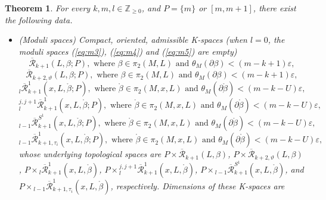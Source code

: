 \documentclass[a4paper]{article}
\newtheorem{theorem}{Theorem}
\numberwithin{equation}{section}
\begin{document}
\begin{theorem}\label{theorem:moduli}
For every $k,m,l\in\mathbb{Z}_{\geq0}$, and $P=\{m\}$ or $[m,m+1]$, there exist the following data.
\begin{itemize}
	\item[(i)] (Moduli spaces) Compact, oriented, admissible K-spaces (when $l=0$, the moduli spaces (\ref{eq:m3}), (\ref{eq:m4}) and (\ref{eq:m5}) are empty)
	\begin{equation}\label{eq:m0}
	\overline{\mathcal{R}}_{k+1}(L,\beta;P),\textrm{ where }\beta\in\pi_2(M,L)\textrm{ and }\theta_M(\partial\beta)<(m-k+1)\varepsilon,
	\end{equation}
	\begin{equation}\label{eq:m1}
	\overline{\mathcal{R}}_{k+2,\vartheta}(L,\beta;P),\textrm{ where }\beta\in\pi_2(M,L)\textrm{ and }\theta_M(\partial\beta)<(m-k+1)\varepsilon,
	\end{equation}
    \begin{equation}\label{eq:m2}
    {}_l\overline{\mathcal{R}}_{k+1}^1(x,L,\ring{\beta};P),\textrm{ where }\ring{\beta}\in\pi_2(M,x,L)\textrm{ and }\theta_M(\partial\ring{\beta})<(m-k-U)\varepsilon,
    \end{equation}
    \begin{equation}\label{eq:m3}
    {}_l^{j,j+1}\overline{\mathcal{R}}_{k+1}^1(x,L,\ring{\beta};P), \textrm{ where }\ring{\beta}\in\pi_2(M,x,L)\textrm{ and }\theta_M(\partial\ring{\beta})<(m-k-U)\varepsilon,
    \end{equation}
    \begin{equation}\label{eq:m4}
    {}_{l-1}\overline{\mathcal{R}}_{k+1}^{S^1}(x,L,\ring{\beta};P),\textrm{ where }\ring{\beta}\in\pi_2(M,x,L)\textrm{ and }\theta_M(\partial\ring{\beta})<(m-k-U)\varepsilon,
    \end{equation}
    \begin{equation}\label{eq:m5}
    {}_{l-1}\overline{\mathcal{R}}_{k+1,\tau_i}^1(x,L,\ring{\beta};P),\textrm{ where }\ring{\beta}\in\pi_2(M,x,L)\textrm{ and }\theta_M(\partial\ring{\beta})<(m-k-U)\varepsilon,
    \end{equation}
    whose underlying topological spaces are $P\times\overline{\mathcal{R}}_{k+1}(L,\beta)$, $P\times\overline{\mathcal{R}}_{k+2,\vartheta}(L,\beta)$, $P\times{}_l\overline{\mathcal{R}}_{k+1}^1(x,L,\ring{\beta})$, $P\times{}_l^{j,j+1}\overline{\mathcal{R}}_{k+1}^1(x,L,\ring{\beta})$, $P\times{}_{l-1}\overline{\mathcal{R}}_{k+1}^{S^1}(x,L,\ring{\beta})$, and $P\times{}_{l-1}\overline{\mathcal{R}}_{k+1,\tau_i}^1(x,L,\ring{\beta})$, respectively. Dimensions of these K-spaces are

\end{itemize}
\end{theorem}
\end{document}
